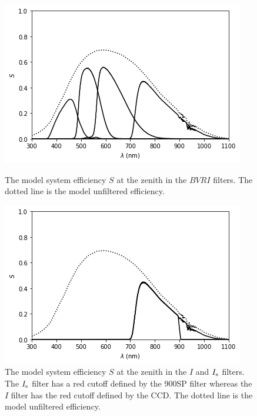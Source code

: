 \begin{figure}
\begin{center}
\includegraphics[width=0.9\linewidth]{figures/huitzi-S-JC-BVRI.png}
\medskip
\caption{The model system efficiency $S$ at the zenith in the $BVRI$ filters. The dotted line is the model unfiltered efficiency.}
\end{center}
\begin{center}
\includegraphics[width=0.9\linewidth]{figures/huitzi-S-JC-IIs.png}
\medskip
\caption{The model system efficiency $S$ at the zenith in the $I$ and $\mbox{$I_\mathrm{s}$}$ filters. The $\mbox{$I_\mathrm{s}$}$ filter has a red cutoff defined by the 900SP filter whereas the $I$ filter has the red cutoff defined by the CCD. The dotted line is the model unfiltered efficiency.}
\label{figure:huitzi-S-JC-IIs}
\end{center}
\end{figure}

